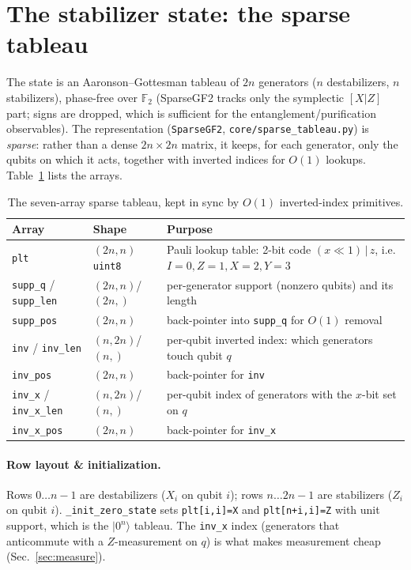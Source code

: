 \documentclass[11pt]{article}
\newcommand{\F}{\mathbb{F}}
\newcommand{\code}[1]{\texttt{#1}}
\newcommand{\file}[1]{\texttt{#1}}
\begin{document}
\section{The stabilizer state: the sparse tableau}
\label{sec:tableau}
The state is an Aaronson--Gottesman tableau of $2n$ generators ($n$ destabilizers, $n$ stabilizers), phase-free
over $\F_2$ (SparseGF2 tracks only the symplectic $[X|Z]$ part; signs are dropped, which is sufficient for the
entanglement/purification observables). The representation (\code{SparseGF2}, \file{core/sparse\_tableau.py}) is
\emph{sparse}: rather than a dense $2n\times2n$ matrix, it keeps, for each generator, only the qubits on which it
acts, together with inverted indices for $O(1)$ lookups. Table~\ref{tab:tableau} lists the arrays.

\begin{table}[h]\centering\small
\begin{tabular}{lll}
\toprule
Array & Shape & Purpose\\
\midrule
\code{plt} & $(2n,n)$ \code{uint8} & Pauli lookup table: 2-bit code $(x{\ll}1)\,|\,z$, i.e. $I{=}0,Z{=}1,X{=}2,Y{=}3$\\
\code{supp\_q} / \code{supp\_len} & $(2n,n)$/$(2n,)$ & per-generator support (nonzero qubits) and its length\\
\code{supp\_pos} & $(2n,n)$ & back-pointer into \code{supp\_q} for $O(1)$ removal\\
\code{inv} / \code{inv\_len} & $(n,2n)$/$(n,)$ & per-qubit inverted index: which generators touch qubit $q$\\
\code{inv\_pos} & $(2n,n)$ & back-pointer for \code{inv}\\
\code{inv\_x} / \code{inv\_x\_len} & $(n,2n)$/$(n,)$ & per-qubit index of generators with the $x$-bit set on $q$\\
\code{inv\_x\_pos} & $(2n,n)$ & back-pointer for \code{inv\_x}\\
\bottomrule
\end{tabular}
\caption{The seven-array sparse tableau, kept in sync by $O(1)$ inverted-index primitives.}
\label{tab:tableau}
\end{table}

\paragraph{Row layout \& initialization.} Rows $0\ldots n{-}1$ are destabilizers ($X_i$ on qubit $i$); rows
$n\ldots 2n{-}1$ are stabilizers ($Z_i$ on qubit $i$). \code{\_init\_zero\_state} sets \code{plt[i,i]=X} and
\code{plt[n+i,i]=Z} with unit support, which is the $|0^n\rangle$ tableau. The \code{inv\_x} index (generators
that anticommute with a $Z$-measurement on $q$) is what makes measurement cheap (Sec.~\ref{sec:measure}).
\end{document}
